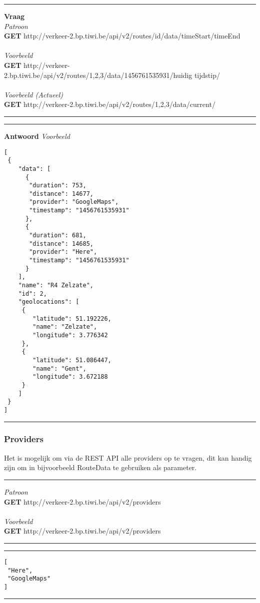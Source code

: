 \documentclass[ps,a4paper,oneside]{report}
\begin{document}
\clearpage
\noindent\rule[0.5ex]{\linewidth}{1pt}
\textbf{Vraag}\\
\textit{Patroon}\\
\textbf{GET} http://verkeer-2.bp.tiwi.be/api/v2/routes/id/data/timeStart/timeEnd\\\\
\textit{Voorbeeld}\\
\textbf{GET} http://verkeer-2.bp.tiwi.be/api/v2/routes/1,2,3/data/1456761535931/huidig tijdstip/\\\\
\textit{Voorbeeld (Actueel)}\\
\textbf{GET} http://verkeer-2.bp.tiwi.be/api/v2/routes/1,2,3/data/current/\\
\noindent\rule[0.5ex]{\linewidth}{1pt}

\noindent\rule[0.5ex]{\linewidth}{1pt}
\textbf{Antwoord}
\textit{Voorbeeld}
\begin{verbatim}[
 {
    "data": [
      {
       "duration": 753,
       "distance": 14677,
       "provider": "GoogleMaps",
       "timestamp": "1456761535931"
      },
      {
       "duration": 681,
       "distance": 14685,
       "provider": "Here",
       "timestamp": "1456761535931"
      }
    ],
    "name": "R4 Zelzate",
    "id": 2,
    "geolocations": [
     {
        "latitude": 51.192226,
        "name": "Zelzate",
        "longitude": 3.776342
     },
     {
        "latitude": 51.086447,
        "name": "Gent",
        "longitude": 3.672188
     }
    ]
 }
]\end{verbatim}
\noindent\rule[0.5ex]{\linewidth}{1pt}
\subsubsection{Providers}
Het is mogelijk om via de REST API alle providers op te vragen, dit kan handig zijn om in bijvoorbeeld RouteData te gebruiken als parameter.\\
\noindent\rule[0.5ex]{\linewidth}{1pt}
\textit{Patroon}\\
\textbf{GET} http://verkeer-2.bp.tiwi.be/api/v2/providers\\\\
\textit{Voorbeeld}\\
\textbf{GET} http://verkeer-2.bp.tiwi.be/api/v2/providers\\
\noindent\rule[0.5ex]{\linewidth}{1pt}
\noindent\rule[0.5ex]{\linewidth}{1pt}
\begin{verbatim}
[
 "Here",
 "GoogleMaps"
]
\end{verbatim}
\noindent\rule[0.5ex]{\linewidth}{1pt}
\end{document}
